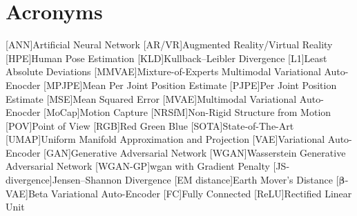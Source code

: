 \chapter*{Acronyms}

\begin{acronym}[TBD]
    [ANN]{Artificial Neural Network}
    [AR/VR]{Augmented Reality/Virtual Reality}
    [HPE]{Human Pose Estimation}
    [KLD]{Kullback–Leibler Divergence}
    [L1]{Least Absolute Deviations}
    [MMVAE]{Mixture-of-Experts Multimodal Variational Auto-Enocder}
    [MPJPE]{Mean Per Joint Position Estimate}
    [PJPE]{Per Joint Position Estimate}
    [MSE]{Mean Squared Error}
    [MVAE]{Multimodal Variational Auto-Enocder}
    [MoCap]{Motion Capture}
    [NRSfM]{Non-Rigid Structure from Motion}
    [POV]{Point of View}
    [RGB]{Red Green Blue}
    [SOTA]{State-of-The-Art}
    [UMAP]{Uniform Manifold Approximation and Projection}
    [VAE]{Variational Auto-Encoder}
    [GAN]{Generative Adversarial Network}
    [WGAN]{Wasserstein Generative Adversarial Network}
    [WGAN-GP]{\ac{wgan} with Gradient Penalty}
    [JS-divergence]{Jensen–Shannon Divergence}
    [EM distance]{Earth Mover's Distance}
    [$\boldsymbol{\beta}$-VAE]{Beta Variational Auto-Encoder}
    [FC]{Fully Connected}
    [ReLU]{Rectified Linear Unit}
    
\end{acronym}

